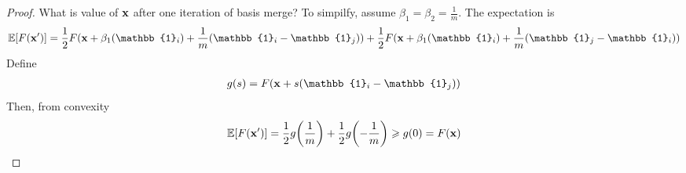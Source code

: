 \begin{theorem}
	\begin{proof}
		What is value of $\vb{x}$ after one iteration of basis merge? To simpilfy, assume $\beta_1=\beta_2=\frac{1}{m}$. The expectation is
		\begin{align}
			\mathbb{E} [F(\vb{x}')] = \frac{1}{2} F(\vb{x} + \beta_1\qty(\mathbb{1}_i)+ \frac{1}{m}\qty(\mathbb{1}_i-\mathbb{1}_j))+\frac{1}{2} F(\vb{x} + \beta_1\qty(\mathbb{1}_i)+ \frac{1}{m}\qty(\mathbb{1}_j-\mathbb{1}_i))
		\end{align}
		Define
		\begin{align}
		g(s) = F\qty(\vb{x}+s\qty(\mathbb{1}_i-\mathbb{1}_j))
		\end{align}
		Then, from convexity
		\begin{align}
		\mathbb{E} [F(\vb{x}')] = \frac{1}{2}g\qty(\frac{1}{m})+\frac{1}{2}g\qty(-\frac{1}{m}) \geqslant g(0) = F(\vb{x})
		\end{align}
	\end{proof}
\end{theorem}


